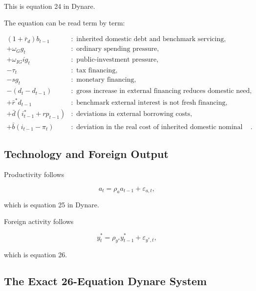 This is equation 24 in Dynare.

The equation can be read term by term:

\begin{align*}
(1+\bar r_d)b_{t-1}
&:
\text{ inherited domestic debt and benchmark servicing},\\
+\omega_Gg_t
&:
\text{ ordinary spending pressure},\\
+\omega_{IG}ig_t
&:
\text{ public-investment pressure},\\
-\tau_t
&:
\text{ tax financing},\\
-sg_t
&:
\text{ monetary financing},\\
-(d_t-d_{t-1})
&:
\text{ gross increase in external financing reduces domestic need},\\
+\bar r^*d_{t-1}
&:
\text{ benchmark external interest is not fresh financing},\\
+\bar d(i_{t-1}^*+rp_{t-1})
&:
\text{ deviations in external borrowing costs},\\
+\bar b(i_{t-1}-\pi_t)
&:
\text{ deviation in the real cost of inherited domestic nominal debt}.
\end{align*}

\subsection{Technology and Foreign Output}
\label{app:real_shocks}

Productivity follows

\begin{equation}
\boxed{
a_t
=
\rho_aa_{t-1}
+
\varepsilon_{a,t},
}
\label{eq:a_final}
\end{equation}

which is equation 25 in Dynare.

Foreign activity follows

\begin{equation}
\boxed{
y_t^{*}
=
\rho_{y^{*}}y_{t-1}^{*}
+
\varepsilon_{y^{*},t},
}
\label{eq:ystar_final}
\end{equation}

which is equation 26.

\subsection{The Exact 26-Equation Dynare System}
\label{app:fullsystem}

